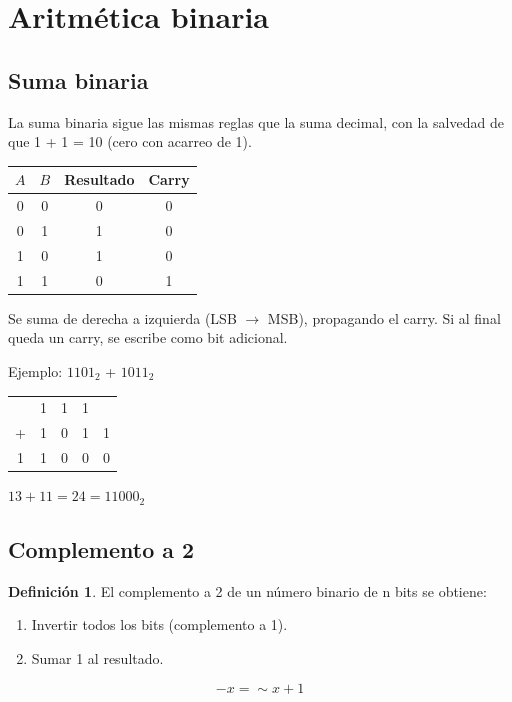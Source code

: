 \documentclass[10pt,a4paper]{article}
\theoremstyle{definition}
\newtheorem{definicion}{Definición}[section]
\begin{document}
\section{Aritmética binaria}

\subsection{Suma binaria}

La suma binaria sigue las mismas reglas que la suma decimal, con la
salvedad de que 1 + 1 = 10 (cero con acarreo de 1).

\begin{center}
    \begin{tabular}{c|c|c|c}
        \toprule
        $A$ & $B$ & Resultado & Carry \\
        \midrule
        0 & 0 & 0 & 0 \\
        0 & 1 & 1 & 0 \\
        1 & 0 & 1 & 0 \\
        1 & 1 & 0 & 1 \\
        \bottomrule
    \end{tabular}
\end{center}

Se suma de derecha a izquierda (LSB $\to$ MSB), propagando el carry.
Si al final queda un carry, se escribe como bit adicional.

Ejemplo: $1101_{2}$ + $1011_{2}$

\begin{center}
\begin{tabular}{ccccc}
    \toprule
        & 1 & 1 & 1 &  \\
      + & 1 & 0 & 1 & 1 \\
        \hline
    1 & 1 & 0 & 0 & 0 \\
\end{tabular}
\end{center}

$13 + 11 = 24 = 11000_{2}$ \checkmark

\subsection{Complemento a 2}

\begin{definicion}
    El complemento a 2 de un número binario de n bits se obtiene:
    \begin{enumerate}
        \item Invertir todos los bits (complemento a 1).
        \item Sumar 1 al resultado.
    \end{enumerate}
    \[
        -x = \sim x + 1
    \]
\end{definicion}
\end{document}
